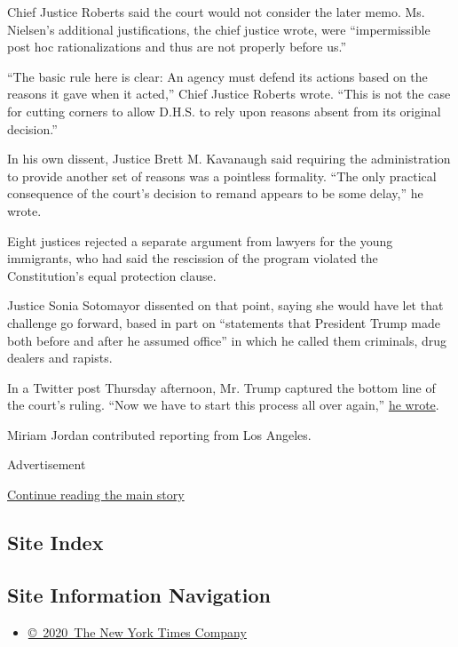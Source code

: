 Chief Justice Roberts said the court would not consider the later memo.
Ms. Nielsen's additional justifications, the chief justice wrote, were
``impermissible post hoc rationalizations and thus are not properly
before us.''

``The basic rule here is clear: An agency must defend its actions based
on the reasons it gave when it acted,'' Chief Justice Roberts wrote.
``This is not the case for cutting corners to allow D.H.S. to rely upon
reasons absent from its original decision.''

In his own dissent, Justice Brett M. Kavanaugh said requiring the
administration to provide another set of reasons was a pointless
formality. ``The only practical consequence of the court's decision to
remand appears to be some delay,'' he wrote.

Eight justices rejected a separate argument from lawyers for the young
immigrants, who had said the rescission of the program violated the
Constitution's equal protection clause.

Justice Sonia Sotomayor dissented on that point, saying she would have
let that challenge go forward, based in part on ``statements that
President Trump made both before and after he assumed office'' in which
he called them criminals, drug dealers and rapists.

In a Twitter post Thursday afternoon, Mr. Trump captured the bottom line
of the court's ruling. ``Now we have to start this process all over
again,''
\href{https://twitter.com/realDonaldTrump/status/1273666793362673665}{he
wrote}.

Miriam Jordan contributed reporting from Los Angeles.

Advertisement

\protect\hyperlink{after-bottom}{Continue reading the main story}

\hypertarget{site-index}{%
\subsection{Site Index}\label{site-index}}

\hypertarget{site-information-navigation}{%
\subsection{Site Information
Navigation}\label{site-information-navigation}}

\begin{itemize}
\tightlist
\item
  \href{https://help.nytimes3xbfgragh.onion/hc/en-us/articles/115014792127-Copyright-notice}{©~2020~The
  New York Times Company}
\end{itemize}

